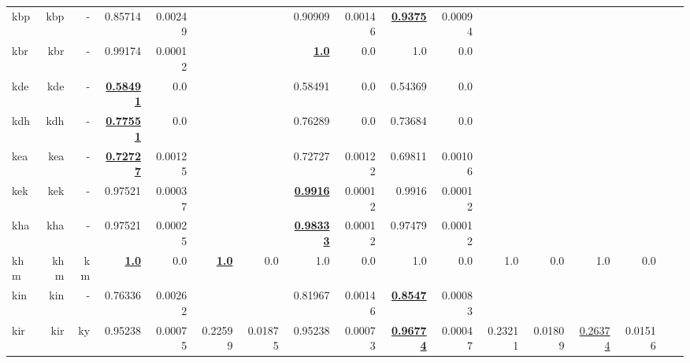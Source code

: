 \documentclass[11pt]{article}
\begin{document}
\begin{table*}[h]
{\begin{tabular}{lrrrrrrrrrrrrrrrr}
kbp         & kbp         & -         & 0.85714         & 0.00249         &          &          & 0.90909         & 0.00146         & \textbf{\underline{0.9375}}         & 0.00094         &          &          &          &          \\
kbr         & kbr         & -         & 0.99174         & 0.00012         &          &          & \textbf{\underline{1.0}}         & 0.0         & 1.0         & 0.0         &          &          &          &          \\
kde         & kde         & -         & \textbf{\underline{0.58491}}         & 0.0         &          &          & 0.58491         & 0.0         & 0.54369         & 0.0         &          &          &          &          \\
kdh         & kdh         & -         & \textbf{\underline{0.77551}}         & 0.0         &          &          & 0.76289         & 0.0         & 0.73684         & 0.0         &          &          &          &          \\
kea         & kea         & -         & \textbf{\underline{0.72727}}         & 0.00125         &          &          & 0.72727         & 0.00122         & 0.69811         & 0.00106         &          &          &          &          \\
kek         & kek         & -         & 0.97521         & 0.00037         &          &          & \textbf{\underline{0.9916}}         & 0.00012         & 0.9916         & 0.00012         &          &          &          &          \\
kha         & kha         & -         & 0.97521         & 0.00025         &          &          & \textbf{\underline{0.98333}}         & 0.00012         & 0.97479         & 0.00012         &          &          &          &          \\
khm         & khm         & km         & \textbf{\underline{1.0}}         & 0.0         & \textbf{\underline{1.0}}         & 0.0         & 1.0         & 0.0         & 1.0         & 0.0         & 1.0         & 0.0         & 1.0         & 0.0         \\
kin         & kin         & -         & 0.76336         & 0.00262         &          &          & 0.81967         & 0.00146         & \textbf{\underline{0.8547}}         & 0.00083         &          &          &          &          \\
kir         & kir         & ky         & 0.95238         & 0.00075         & 0.22599         & 0.01875         & 0.95238         & 0.00073         & \textbf{\underline{0.96774}}         & 0.00047         & 0.23211         & 0.01809         & \underline{0.26374}         & 0.01516         \\

\end{tabular}}
\end{table*}
\end{document}
